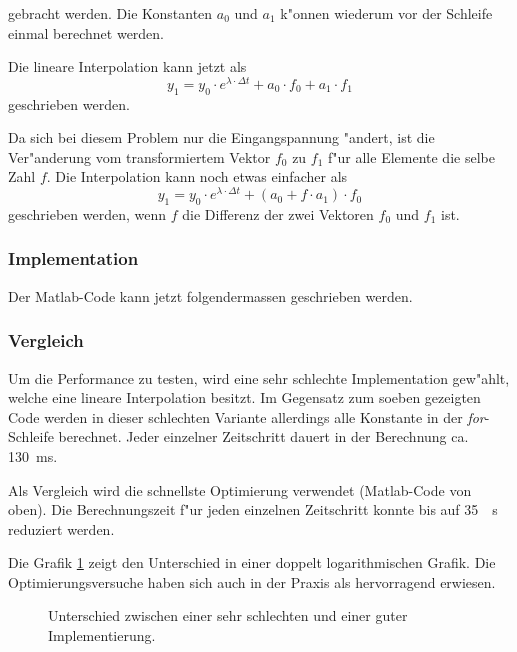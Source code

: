 \begin{refsection}
gebracht werden. Die Konstanten $a_0$ und $a_1$ k"onnen wiederum vor der Schleife einmal berechnet werden. 

Die lineare Interpolation kann jetzt als 
\begin{equation*}
	y_1 = y_0 \cdot e^{\lambda \cdot \Delta t} + a_0 \cdot f_0 + a_1 \cdot f_1
\end{equation*}
geschrieben werden. 

Da sich bei diesem Problem nur die Eingangspannung "andert, ist die Ver"anderung vom transformiertem Vektor $f_0$ zu $f_1$ f"ur alle Elemente die selbe Zahl $f$. Die Interpolation kann noch etwas einfacher als
\begin{equation*}
	y_1 = y_0 \cdot e^{\lambda \cdot \Delta t} + (a_0 + f \cdot  a_1) \cdot f_0
\end{equation*}
geschrieben werden, wenn $f$ die Differenz der zwei Vektoren $f_0$ und $f_1$ ist. 

\subsubsection{Implementation}
Der Matlab-Code kann jetzt folgendermassen geschrieben werden.

{\scriptsize }

\subsubsection{Vergleich}

Um die Performance zu testen, wird eine sehr schlechte Implementation gew"ahlt, welche eine lineare Interpolation besitzt. Im Gegensatz zum soeben gezeigten Code werden in dieser schlechten Variante allerdings alle Konstante in der \textit{for}-Schleife berechnet. Jeder einzelner Zeitschritt dauert in der Berechnung ca. \SI{130}{ms}. 

Als Vergleich wird die schnellste Optimierung verwendet (Matlab-Code von oben). Die Berechnungszeit f"ur jeden einzelnen Zeitschritt konnte bis auf \SI{35}{\mu \second} reduziert werden. 

Die Grafik \ref{trafo:Optimierung} zeigt den Unterschied in einer doppelt logarithmischen Grafik. Die Optimierungsversuche haben sich auch in der Praxis als hervorragend erwiesen.

\begin{figure}
	\centering
	\caption{Unterschied zwischen einer sehr schlechten und einer guter Implementierung.}
	\label{trafo:Optimierung}
\end{figure}


\end{refsection}
